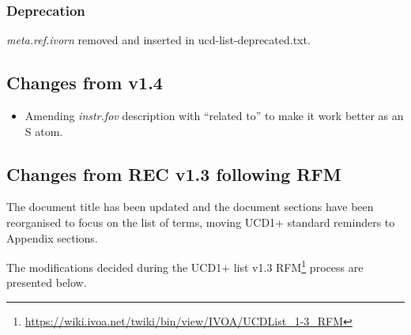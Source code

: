 \documentclass[11pt,a4paper]{ivoa}
\begin{document}
\subsubsection*{Deprecation}
\emph{meta.ref.ivorn} removed and inserted in ucd-list-deprecated.txt.

\subsection{Changes from v1.4}

\begin{itemize}
\item Amending \emph{instr.fov} description with ``related to'' to make
it work better as an S atom.
\end{itemize}


\subsection{Changes from REC v1.3 following RFM}
The document title has been updated and the document sections have been reorganised to focus on 
the list of terms, moving UCD1+ standard reminders to Appendix sections. 

The modifications decided during the UCD1+ list v1.3 
RFM\footnote{\url{https://wiki.ivoa.net/twiki/bin/view/IVOA/UCDList_1-3_RFM}} process are presented below.

\end{document}
